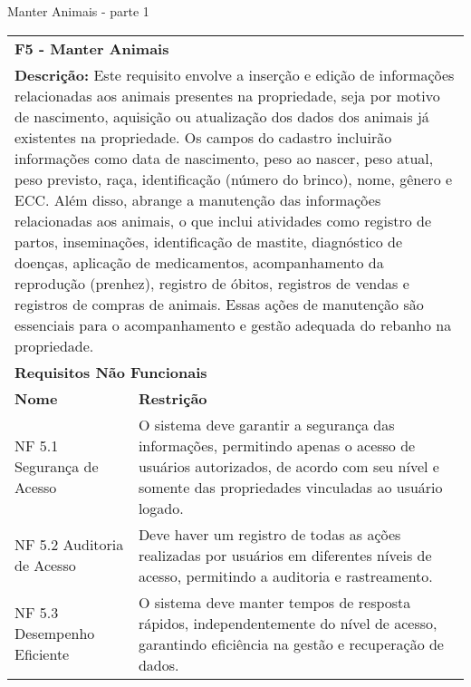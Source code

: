 \begin{tabframed}[!htb]
  \caption{Manter Animais - parte 1}
  \label{quad:requisitoManterAnimaisParte1}
  \renewcommand{\arraystretch}{1.5}
  \begin{tabular}{|l|l|}
    \cline{1-2}
    \multicolumn{2}{|l|}{\textbf{F5 - Manter Animais}}
    \\ \cline{1-2}

    \multicolumn{2}{|p{15cm}|}{
    \raggedright \textbf{Descrição:} Este requisito envolve a inserção e edição de informações relacionadas aos animais presentes na propriedade, seja por motivo de nascimento, aquisição ou atualização dos dados dos animais já existentes na propriedade. Os campos do cadastro incluirão informações como data de nascimento, peso ao nascer, peso atual, peso previsto, raça, identificação (número do brinco), nome, gênero e \gls{ECC}.
    Além disso, abrange a manutenção das informações relacionadas aos animais, o que inclui atividades como registro de partos, inseminações, identificação de mastite, diagnóstico de doenças, aplicação de medicamentos, acompanhamento da reprodução (prenhez), registro de óbitos, registros de vendas e registros de compras de animais. Essas ações de manutenção são essenciais para o acompanhamento e gestão adequada do rebanho na propriedade.
    }
    \\ \cline{1-2}

    \multicolumn{2}{|l|}{\textbf{Requisitos Não Funcionais}}
    \\ \cline{1-2}

    \textbf{Nome} &
    \textbf{Restrição}
    \\ \cline{1-2}

    \multicolumn{1}{|p{3cm}|}{\raggedright NF 5.1 Segurança de Acesso}
                  &
    \multicolumn{1}{|p{12cm}|}{\raggedright O sistema deve garantir a segurança das informações, permitindo apenas o acesso de usuários autorizados, de acordo com seu nível e somente das propriedades vinculadas ao usuário logado.}
    \\ \cline{1-2}

    \multicolumn{1}{|p{3cm}|}{\raggedright NF 5.2 Auditoria de Acesso}
                  &
    \multicolumn{1}{|p{12cm}|}{\raggedright Deve haver um registro de todas as ações realizadas por usuários em diferentes níveis de acesso, permitindo a auditoria e rastreamento.}
    \\ \cline{1-2}

    \multicolumn{1}{|p{3.2cm}|}{\raggedright NF 5.3 Desempenho Eficiente}
                  &
    \multicolumn{1}{|p{12cm}|}{\raggedright O sistema deve manter tempos de resposta rápidos, independentemente do nível de acesso, garantindo eficiência na gestão e recuperação de dados.}
    \\ \cline{1-2}


\end{tabular}
\end{tabframed}
